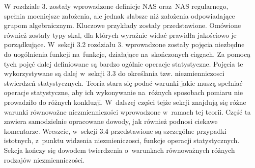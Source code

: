 \documentclass[12pt,a4paper]{report}
\begin{document}
W rozdziale 3. zostały wprowadzone definicje NAS oraz~NAS regularnego, spełnia mocniejsze założenia, ale jednak słabsze niż założenia odpowiadające grupom algebraicznym. Kluczowe przykłady zostały przedstawione. Omówione również zostały typy skal, dla których wyraźnie widać prawidła jakościowo je porządkujące. W~sekcji 3.2 rozdziału 3. wprowadzone zostały pojęcia niezbędne do uogólnienia funkcji na~funkcje, działające na~skończonych ciągach. Za pomocą tych pojęć dalej definiowane są bardzo ogólnie operacje statystyczne. Pojęcia te wykorzystywane są dalej w~sekcji 3.3 do określania tzw. niezmienniczosci stwierdzeń statystycznych. Teoria stara się podać warunki jakie muszą spełniać operacje statystyczne, aby ich wykonywanie na~różnych sposobach pomiaru nie prowadziło do różnych konkluzji. W~dalszej części tejże sekcji znajdują się różne warunki równoważne niezmienniczości wprowadzone w~ramach tej teorii. Część ta zawiera samodzielnie opracowane dowody, jak również podnosi ciekawe komentarze. Wreszcie, w~sekcji 3.4 przedstawione są szczególne przypadki istotnych, z~punktu widzenia niezmieniczosci, funkcje operacji statystycznych. Sekcja kończy się dowodem twierdzenia o~warunkach równoważnych różnych rodzajów niezmienniczości.




\end{document}
